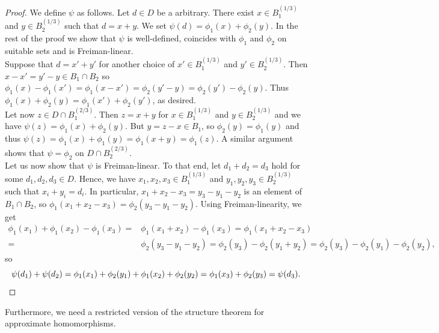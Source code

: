\documentclass[a4paper,11pt]{article}
\numberwithin{theorem}{section}
\theoremstyle{definition}
\begin{document}
\begin{proof}
    We define $\psi$ as follows. Let $d \in D$ be a arbitrary. There exist $x \in B_1^{(1/3)}$ and $y \in B_2^{(1/3)}$ such that $d = x + y$. We set $\psi(d) = \phi_1(x) + \phi_2(y)$. In the rest of the proof we show that $\psi$ is well-defined, coincides with $\phi_1$ and $\phi_2$ on suitable sets and is Freiman-linear.\\
    \indent Suppose that $d = x' + y'$ for another choice of $x' \in B_1^{(1/3)}$ and $y' \in B_2^{(1/3)}$. Then $x - x' = y' - y \in B_1 \cap B_2$ so $\phi_1(x) - \phi_1(x') = \phi_1(x - x') = \phi_2(y' - y) = \phi_2(y') - \phi_2(y)$. Thus $\phi_1(x) + \phi_2(y) = \phi_1(x') + \phi_2(y')$, as desired.\\
    \indent Let now $z \in D \cap B_1^{(2/3)}$. Then $z = x + y$ for $x \in B_1^{(1/3)}$ and $y \in B_2^{(1/3)}$ and we have $\psi(z) = \phi_1(x) + \phi_2(y)$. But $y = z - x \in B_1$, so $\phi_2(y) = \phi_1(y)$ and thus $\psi(z) = \phi_1(x) + \phi_1(y) = \phi_1(x + y) = \phi_1(z)$. A similar argument shows that $\psi = \phi_2$ on $D \cap B_2^{(2/3)}$.\\
    \indent Let us now show that $\psi$ is Freiman-linear. To that end, let $d_1 + d_2 = d_3$ hold for some $d_1, d_2, d_3 \in D$. Hence, we have $x_1, x_2, x_3 \in B_1^{(1/3)}$ and $y_1, y_2, y_3 \in B_2^{(1/3)}$ such that $x_i + y_i = d_i$. In particular, $x_1 + x_2 - x_3 = y_3 - y_1 - y_2$ is an element of $B_1 \cap B_2$, so $\phi_1(x_1 + x_2 - x_3) = \phi_2(y_3 - y_1  - y_2)$. Using Freiman-linearity, we get
    \begin{align*}\phi_1(x_1) + \phi_1(x_2) - \phi_1(x_3) = &\phi_1(x_1 + x_2) - \phi_1(x_3) = \phi_1(x_1 + x_2 - x_3) \\
    =& \phi_2(y_3 - y_1 - y_2) = \phi_2(y_3) - \phi_2(y_1 + y_2) = \phi_2(y_3) - \phi_2(y_1) - \phi_2(y_2),\end{align*}
    so 
    \[\psi(d_1) + \psi(d_2) = \phi_1(x_1) + \phi_2(y_1) + \phi_1(x_2) + \phi_2(y_2) = \phi_1(x_3) + \phi_2(y_3) = \psi(d_3).\qedhere\]
\end{proof}

Furthermore, we need a restricted version of the structure theorem for approximate homomorphisms.
\end{document}
